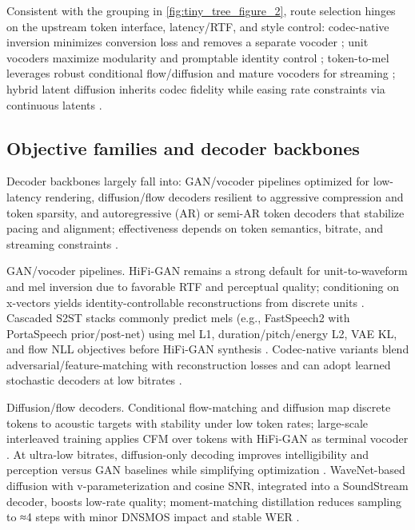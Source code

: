 Consistent with the grouping in \autoref{fig:tiny_tree_figure_2}, route selection hinges on the upstream token interface, latency/RTF, and style control: codec-native inversion minimizes conversion loss and removes a separate vocoder \cite{peng2024mslms2stmultitaskspeechlanguagemodeltext}; unit vocoders maximize modularity and promptable identity control \cite{ma2024languagemodelcanlistenwhilespeaking}; token-to-mel leverages robust conditional flow/diffusion and mature vocoders for streaming \cite{zeng2024scalingspeechtextpretrainingsyntheticint,wang2025tadicodectextawarediffusionspeechtokeniz}; hybrid latent diffusion inherits codec fidelity while easing rate constraints via continuous latents \cite{yang2025diffsoundstreamefficientspeechtokenizati}.

\subsection{Objective families and decoder backbones} \label{subsec:Objective families and decoder backbones}
Decoder backbones largely fall into: GAN/vocoder pipelines optimized for low-latency rendering, diffusion/flow decoders resilient to aggressive compression and token sparsity, and autoregressive (AR) or semi-AR token decoders that stabilize pacing and alignment; effectiveness depends on token semantics, bitrate, and streaming constraints \cite{li2024investigatingneuralaudiocodecsspeechlang,shen2024acousticbpespeechgenerationdiscretetoken,zhang2024speechtokenizerunifiedspeechtokenizerlar,yang2025diffsoundstreamefficientspeechtokenizati}.

GAN/vocoder pipelines. HiFi-GAN remains a strong default for unit-to-waveform and mel inversion due to favorable RTF and perceptual quality; conditioning on x-vectors yields identity-controllable reconstructions from discrete units \cite{nakata2024jchatjapaneselargescalespokendialoguecor}. Cascaded S2ST stacks commonly predict mels (e.g., FastSpeech2 with PortaSpeech prior/post-net) using mel L1, duration/pitch/energy L2, VAE KL, and flow NLL objectives before HiFi-GAN synthesis \cite{huang2023holisticcascadesystembenchmarkhumanevalu}. Codec-native variants blend adversarial/feature-matching with reconstruction losses and can adopt learned stochastic decoders at low bitrates \cite{yang2025diffsoundstreamefficientspeechtokenizati}.

Diffusion/flow decoders. Conditional flow-matching and diffusion map discrete tokens to acoustic targets with stability under low token rates; large-scale interleaved training applies CFM over tokens with HiFi-GAN as terminal vocoder \cite{zeng2024scalingspeechtextpretrainingsyntheticint}. At ultra-low bitrates, diffusion-only decoding improves intelligibility and perception versus GAN baselines while simplifying optimization \cite{wang2025tadicodectextawarediffusionspeechtokeniz}. WaveNet-based diffusion with v-parameterization and cosine SNR, integrated into a SoundStream decoder, boosts low-rate quality; moment-matching distillation reduces sampling to ≈4 steps with minor DNSMOS impact and stable WER \cite{yang2025diffsoundstreamefficientspeechtokenizati}.

